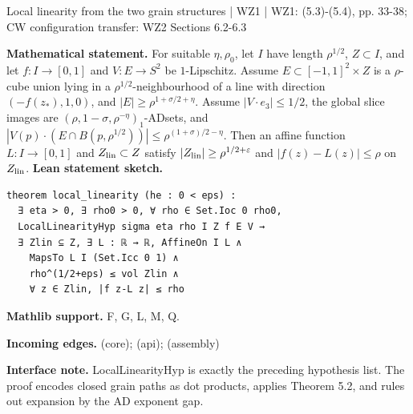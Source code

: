\documentclass[10pt,a4paper]{article}
\newcommand{\nodecard}[1]{\hyperlink{node-#1}{\texttt{\detokenize{#1}}}}
\begin{document}
\begin{minipage}{\linewidth}
\hypertarget{node-L5_3}{}
\begin{tcolorbox}[colback=white,colframe=regularityfg,colbacktitle=regularitybg,coltitle=ink,boxrule=0.45pt,arc=1.6mm,left=3mm,right=3mm,top=2mm,bottom=2mm,title={\sffamily\bfseries WZ1 Lemma 5.3 \hfill \texttt{L5\_3}}]
{\sffamily\small\color{muted}Local linearity from the two grain structures | WZ1 | WZ1: (5.3)-(5.4), pp. 33-38; CW configuration transfer: WZ2 Sections 6.2-6.3}\par
\textbf{Mathematical statement.} For suitable $\eta,\rho_0$, let $I$ have length $\rho^{1/2}$, $Z\subset I$, and let $f:I\to[0,1]$ and $V:E\to S^2$ be $1$-Lipschitz.
Assume $E\subset[-1,1]^2\times Z$ is a $\rho$-cube union lying in a $\rho^{1/2}$-neighbourhood of a line with direction $(-f(z_*),1,0)$, and $|E|\ge\rho^{1+\sigma/2+\eta}$.
Assume $|V\cdot e_3|\le1/2$, the global slice images are $(\rho,1-\sigma,\rho^{-\eta})_1$-ADsets, and
$|V(p)\cdot(E\cap B(p,\rho^{1/2}))|\le\rho^{(1+\sigma)/2-\eta}$.
Then an affine function $L:I\to[0,1]$ and $Z_{\rm lin}\subset Z$ satisfy
$|Z_{\rm lin}|\ge\rho^{1/2+\varepsilon}$ and $|f(z)-L(z)|\le\rho$ on $Z_{\rm lin}$.
\smallskip\textbf{Lean statement sketch.}
\begin{Verbatim}[fontsize=\small,breaklines=true,breakanywhere=true,tabsize=2]
theorem local_linearity (he : 0 < eps) :
  ∃ eta > 0, ∃ rho0 > 0, ∀ rho ∈ Set.Ioc 0 rho0,
  LocalLinearityHyp sigma eta rho I Z f E V →
  ∃ Zlin ⊆ Z, ∃ L : ℝ → ℝ, AffineOn I L ∧
    MapsTo L I (Set.Icc 0 1) ∧
    rho^(1/2+eps) ≤ vol Zlin ∧
    ∀ z ∈ Zlin, |f z-L z| ≤ rho
\end{Verbatim}
{\footnotesize\textbf{Mathlib support.} F, G, L, M, Q.\par
\textbf{Incoming edges.} \nodecard{T5_2} (core); \nodecard{Iadgap} (api); \nodecard{W2P6_3} (assembly)\par}
{\footnotesize\textbf{Interface note.} LocalLinearityHyp is exactly the preceding hypothesis list. The proof encodes closed grain paths as dot products, applies Theorem 5.2, and rules out expansion by the AD exponent gap.}
\end{tcolorbox}\end{minipage}\par\medskip
\end{document}
